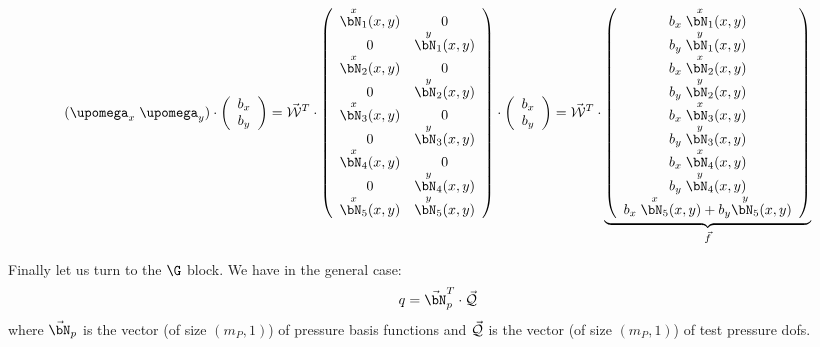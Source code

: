 \[
(\upomega_x \; \upomega_y) \cdot 
\left(
\begin{array}{c}
b_x \\ b_y
\end{array}
\right)
= 
\vec{\cal W}^T \cdot 
\left(
\begin{array}{cc}
\overset{\tiny x}{\bN_1}(x,y) & 0 \\
0 & \overset{\tiny y}{\bN_1}(x,y) \\
\overset{\tiny x}{\bN_2}(x,y) & 0 \\
0 & \overset{\tiny y}{\bN_2}(x,y) \\
\overset{\tiny x}{\bN_3}(x,y) & 0 \\
0 & \overset{\tiny y}{\bN_3}(x,y) \\
\overset{\tiny x}{\bN_4}(x,y) & 0 \\
0 & \overset{\tiny y}{\bN_4}(x,y) \\
\overset{\tiny x}{\bN_5}(x,y)  & \overset{\tiny y}{\bN_5}(x,y) 
\end{array}
\right)
\cdot
\left(
\begin{array}{c}
b_x \\ b_y
\end{array}
\right)
=
\vec{\cal W}^T \cdot 
\underbrace{
\left(
\begin{array}{c}
b_x\; \overset{\tiny x}{\bN_1}(x,y) \\
b_y\; \overset{\tiny y}{\bN_1}(x,y) \\
b_x\; \overset{\tiny x}{\bN_2}(x,y) \\
b_y\; \overset{\tiny y}{\bN_2}(x,y) \\
b_x\; \overset{\tiny x}{\bN_3}(x,y) \\
b_y\; \overset{\tiny y}{\bN_3}(x,y) \\
b_x\; \overset{\tiny x}{\bN_4}(x,y) \\
b_y\; \overset{\tiny y}{\bN_4}(x,y) \\
b_x\; \overset{\tiny x}{\bN_5}(x,y) +b_y \overset{\tiny y}{\bN_5}(x,y) 
\end{array}
\right)
}_{\vec{f}}
\]

Finally let us turn to the $\G$ block.
We have in the general case:
\[
q = \vec{\bN}_p^T \cdot \vec{\cal Q}
\]
where $\vec{\bN}_p$ is the vector (of size $(m_P,1)$) of pressure basis functions
and $\vec{\cal Q}$ is the vector (of size $(m_P,1)$) of test pressure dofs.

